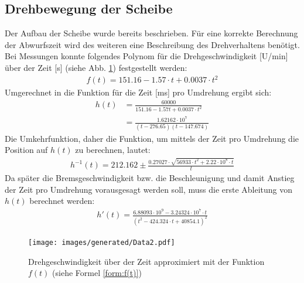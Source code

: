 \subsection{Drehbewegung der Scheibe}
Der Aufbau der Scheibe wurde bereits beschrieben.
Für eine korrekte Berechnung der Abwurfszeit wird des weiteren eine Beschreibung des Drehverhaltens benötigt.
Bei Messungen konnte folgendes Polynom für die Drehgeschwindigkeit [U/min] über der Zeit [s] (siehe Abb. \ref{img:drehgeschw}) festgestellt werden:
\begin{align}
	f(t) = 151.16 - 1.57 \cdot t + 0.0037 \cdot t^2 \label{form:f(t)}
\end{align}
Umgerechnet in die Funktion für die Zeit [ms] pro Umdrehung ergibt sich:
\begin{align}
	h(t) 	&= \frac{60000}{151.16 - 1.57t + 0.0037 \cdot t^2} \\
	    	&= \frac{1.62162\cdot 10^7}{(t-276.65) (t-147.674)} \label{form:h(t)}
\end{align}
Die Umkehrfunktion, daher die Funktion, um mittels der Zeit pro Umdrehung die Position auf $h(t)$ zu berechnen, lautet:
\begin{align}
	h^{-1}(t) 	= 212.162 \pm \frac{0.27027 \cdot \sqrt{56933\cdot t^2 + 2.22\cdot 10^8 \cdot t}}{t} \label{form:h-1(t)}
\end{align}
Da später die Bremsgeschwindigkeit bzw. die Beschleunigung und damit Anstieg der Zeit pro Umdrehung vorausgesagt werden soll, muss die erste Ableitung von $h(t)$ berechnet werden:
\begin{align}
	h'(t) 	= \frac{6.88093\cdot 10^9 - 3.24324 \cdot 10^7 \cdot t}{(t^2 - 424.324\cdot t + 40854.1)^2} \label{form:h'(t)}
\end{align}

\begin{figure}[hb] \centering
	\texttt{[image: images/generated/Data2.pdf]}
	\caption{Drehgeschwindigkeit über der Zeit approximiert mit der Funktion $f(t)$ (siehe Formel \ref{form:f(t)})}
	\label{img:drehgeschw}
\end{figure}

